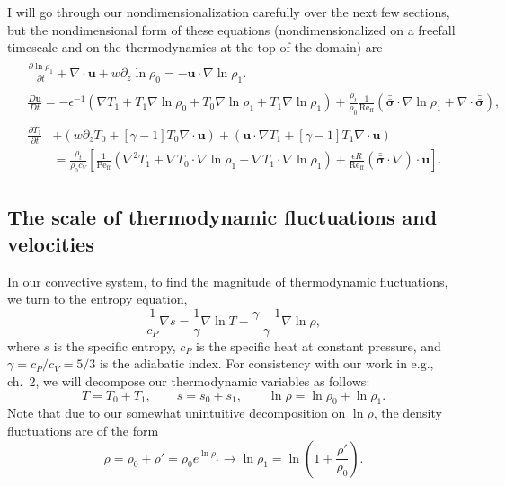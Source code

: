 \documentclass[aps, pre, onecolumn, nofootinbib, notitlepage, groupedaddress, amsfonts, amssymb, amsmath, longbibliography, superscriptaddress]{revtex4-1}
\newcommand{\grad}{\ensuremath{\nabla}}
\newcommand{\lilstressT}{\ensuremath{\bm{\bar{\bar{\sigma}}}}}
\begin{document}
I will go through our nondimensionalization carefully over the next few sections, but the nondimensional form of these equations (nondimensionalized on a freefall timescale and on the thermodynamics at the top of the domain) are
\begin{align}
&\begin{aligned}
\frac{\partial \ln\rho_1}{\partial t} + \grad\cdot\bm{u} + w\partial_z \ln\rho_0 = -\bm{u}\cdot\grad\ln\rho_1.
	\label{eqn:ab17continuity_nondim}
\end{aligned}\\
&\begin{aligned}
\frac{D \bm{u}}{D t} = -\epsilon^{-1}\left(\grad T_1 + T_1\grad\ln\rho_0 + T_0 \grad\ln\rho_1 + T_1\grad\ln\rho_1\right)
+ \frac{\rho_t}{\rho_0}\frac{1}{\text{Re}_{\text{ff}}} \left(\lilstressT\cdot\grad\ln\rho_1 + \grad\cdot\lilstressT\right),
\label{eqn:ab17momentum_nondim}
\end{aligned}\\
&\begin{aligned}
\frac{\partial T_1}{\partial t} &+ (w \partial_z T_0 + [\gamma-1]T_0\grad\cdot\bm{u}) + (\bm{u}\cdot\grad T_1 + [\gamma-1] T_1\grad\cdot\bm{u})
\\
&= \frac{\rho_t}{\rho_0 c_V}\left[
\frac{1}{\text{Pe}_{\text{ff}}}(\grad^2 T_1 + \grad T_0 \cdot\grad\ln\rho_1 + \grad T_1 \cdot\grad\ln\rho_1)
+ \frac{\epsilon R}{\text{Re}_{\text{ff}}} (\lilstressT\cdot\grad)\cdot\bm{u}
\right].
	\label{eqn:ab17energy_nondim}
\end{aligned}
\end{align}



\subsection{The scale of thermodynamic fluctuations and velocities}
In our convective system, to find the magnitude of thermodynamic fluctuations, we turn to the entropy equation,
\begin{equation}
\frac{1}{c_P}\grad s = \frac{1}{\gamma}\grad\ln T - \frac{\gamma - 1}{\gamma}\grad \ln \rho,
\end{equation}
where $s$ is the specific entropy, $c_P$ is the specific heat at constant pressure, and $\gamma = c_P/c_V = 5/3$ is the adiabatic index.
For consistency with our work in e.g., ch.~2, we will decompose our thermodynamic variables as follows:
$$
T = T_0 + T_1, \qquad
s = s_0 + s_1, \qquad
\ln\rho = \ln\rho_0 + \ln\rho_1.
$$
Note that due to our somewhat unintuitive decomposition on $\ln\rho$, the density fluctuations are of the form
$$
\rho = \rho_0 + \rho' = \rho_0 e^{\ln\rho_1} \rightarrow \ln\rho_1 = \ln\left(1 + \frac{\rho'}{\rho_0}\right).
$$
\end{document}
